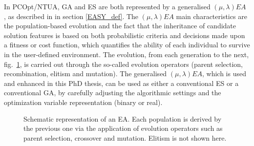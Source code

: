 In PCOpt/NTUA, GA and ES are both represented by a generalised $(\mu,\lambda)EA$ \cite{phd_Giotis,phd_Karakasis,phd_Kampolis}, as described in in section \ref{EASY_def}.  The $(\mu,\lambda)EA$ main characteristics are the population-based evolution and the fact that the inheritance of candidate solution features is based on both probabilistic criteria and decisions made upon a fitness or cost function, which quantifies the ability of each individual to survive in the user-defined environment. The evolution, from each generation to the next, fig.\ \ref{EA}, is carried out through the so-called evolution operators (parent selection, recombination, elitism and mutation). The generalised $(\mu,\lambda)EA$, which is used and enhanced in this PhD thesis, can be used as either a conventional ES or a conventional GA, by carefully adjusting the algorithmic settings and the optimization variable representation (binary or real).  

\begin{figure}[h!]
\begin{minipage}[b]{1\linewidth}
 \centering
\end{minipage}
\caption{Schematic representation of an EA. Each population is derived by the previous one via the application of evolution operators such as parent selection, crossover and mutation. Elitism is not shown here. } 
\label{EA}
\end{figure}



